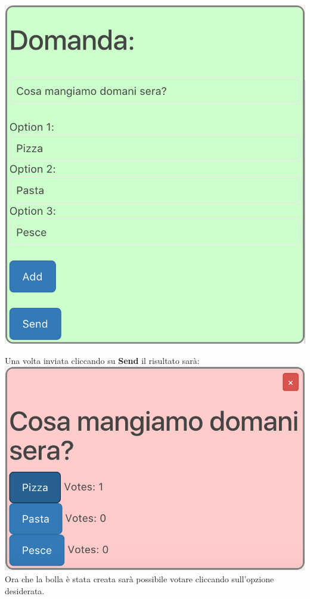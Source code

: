 \includegraphics[scale=0.75]{img/pollConfig.png}

Una volta inviata cliccando su \textbf{Send} il risultato sarà:\\

\includegraphics[scale=0.74]{img/poll.png}
\\
Ora che la bolla è stata creata sarà possibile votare cliccando sull'opzione desiderata.
